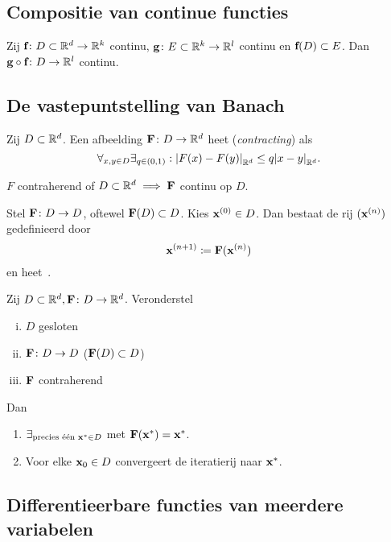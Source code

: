 \documentclass{2wa40summary}
\begin{document}
	\subsection{Compositie van continue functies}
	\theorem Zij ${\textbf{f}}\colon D\subset\mathbb{R}^d\to \mathbb{R}^k$ continu, ${\textbf{g}}\colon E\subset\mathbb{R}^k\to \mathbb{R}^l$ continu en ${\textbf{f}}(D) \subset E$. Dan ${\textbf{g}} \circ {\textbf{f}}\colon D\to \mathbb{R}^l$ continu.
	
	\subsection{De vastepuntstelling van Banach}
	\begin{theorem}
		Zij $D \subset \mathbb{R}^d$.
		Een afbeelding ${\textbf{F}}\colon D \to \mathbb{R}^d$ heet  (\textit{contracting}) als
		\[\forall _{x,y\in D}\exists _{q \in (0,1)}:{\left|F(x)-F(y)\right|}_{\mathbb{R}^d} \leq q{\left|x-y\right|}_{\mathbb{R}^d}. \]
	\end{theorem}
	
	
	\gevolg $F$ contraherend of $D\subset\mathbb{R}^d\implies{\textbf{F}}$ continu op $D$.
	
	
	\begin{define}[iteratierij]
		Stel ${\textbf{F}}\colon D\to D$, oftewel ${\textbf{F}}(D) \subset D$. Kies  ${\textbf{x}}^{(0)} \in D$.
		Dan bestaat de rij $({\textbf{x}}^{(n)})$ gedefinieerd door
		\[
		{\textbf{x}}^{(n+1)} \coloneqq  {\textbf{F}}({\textbf{x}}^{(n)})
		\]
		en heet~.
	\end{define}
	
	
	
	Zij $D \subset \mathbb{R}^d, {\textbf{F}}\colon D\to \mathbb{R}^d$. Veronderstel
	\begin{enumerate}[(i)]
		\item $D$ gesloten
		\item ${\textbf{F}}\colon D \to D$ (${\textbf{F}}(D) \subset D$)
		\item ${\textbf{F}}$ contraherend
	\end{enumerate}
	Dan
	\begin{enumerate}[(1)]
		\item $\exists_{\text{precies \'e\'en } {\textbf{x}}^* \in D}$ met ${\textbf{F}}({\textbf{x}}^*)={\textbf{x}}^*$.
		\item Voor elke ${\textbf{x}}_0 \in D$ convergeert de iteratierij naar ${\textbf{x}}^*$.
	\end{enumerate}
	
	\subsection{Differentieerbare functies van meerdere variabelen}
\end{document}
